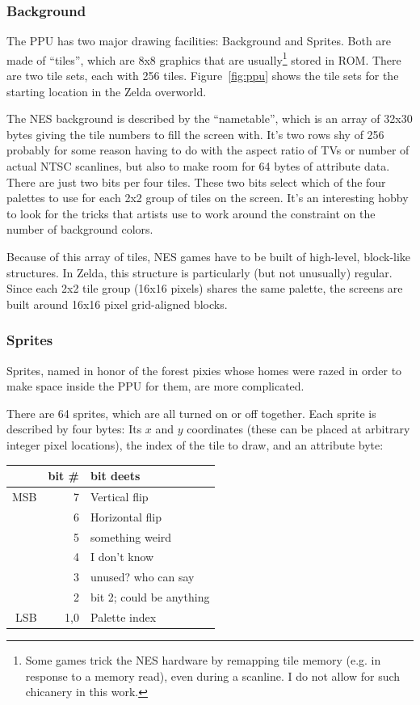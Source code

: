 \documentclass[twocolumn]{article}
\begin{document}
\subsubsection{Background}
The PPU has two major drawing facilities: Background and Sprites. Both
are made of ``tiles'', which are 8x8 graphics that are
usually\footnote{Some games trick the NES hardware by remapping tile
memory (e.g. in response to a memory read), even during a scanline. I
do not allow for such chicanery in this work.} stored in ROM. There
are two tile sets, each with 256 tiles. Figure~\ref{fig:ppu} shows the
tile sets for the starting location in the Zelda overworld.

The NES background is described by the ``nametable'', which is an
array of 32x30 bytes giving the tile numbers to fill the screen with.
It's two rows shy of 256 probably for some reason having to do with
the aspect ratio of TVs or number of actual NTSC scanlines, but also
to make room for 64 bytes of attribute data. There are just two bits
per four tiles. These two bits select which of the four palettes to
use for each 2x2 group of tiles on the screen. It's an interesting hobby to
look for the tricks that artists use to work around the constraint on
the number of background colors. %

Because of this array of tiles, NES games have to be built of
high-level, block-like structures. In Zelda, this structure is
particularly (but not unusually) regular. Since each 2x2 tile group
(16x16 pixels) shares the same palette, the screens are built around
16x16 pixel grid-aligned blocks.

\subsubsection{Sprites} \label{sec:sprites}

Sprites, named in honor of the forest pixies whose homes were razed in
order to make space inside the PPU for them, are more complicated.

There are 64 sprites, which are all turned on or off together. Each
sprite is described by four bytes: Its $x$ and $y$ coordinates (these
can be placed at arbitrary integer pixel locations), the index of
the tile to draw, and an attribute byte:

\begin{tabular}{rrl}
    & bit \# & bit deets \\
\hline
MSB & 7      & Vertical flip \\
    & 6      & Horizontal flip \\
    & 5      & something weird \\
    & 4      & I don't know \\
    & 3      & unused? who can say \\
    & 2      & bit 2; could be anything \\
LSB & 1,0    & Palette index \\
\end{tabular}
\end{document}
